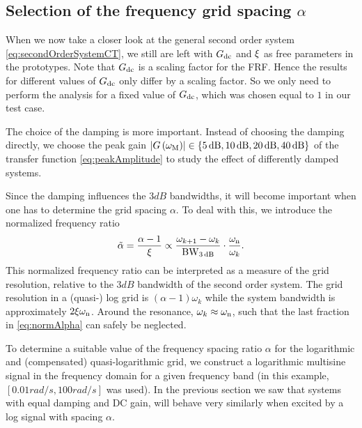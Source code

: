   \subsection{Selection of the frequency grid spacing $\alpha$}
  When we now take a closer look at the general second order system \eqref{eq:secondOrderSystemCT}, we still are left with $G_{\mathrm{dc}}$ and $\xi$ as free parameters in the prototypes.
  Note that $G_{\mathrm{dc}}$ is a scaling factor for the FRF.
  Hence the results for different values of $G_{\mathrm{dc}}$ only differ by a scaling factor.
  So we only need to perform the analysis for a fixed value of $G_{\mathrm{dc}}$, which was chosen equal to $1$ in our test case.

  The choice of the damping is more important.
  Instead of choosing the damping directly, we choose the peak gain $\left| G\left( \omega_{\mathrm{M}} \right) \right| \in \left\{5 \,\mathrm{dB}, 10 \,\mathrm{dB}, 20 \,\mathrm{dB}, 40 \,\mathrm{dB} \right\}$ of the transfer function \eqref{eq:peakAmplitude} to study the effect of differently damped systems.

  Since the damping influences the $3\unit{dB}$ bandwidths, it will become important when one has to determine the grid spacing $\alpha$.
  To deal with this, we introduce the normalized frequency ratio
  \begin{equation}
    \tilde{\alpha} = \frac{\alpha - 1}
                          {\xi}
                   \propto \frac{\omega_{k+1} - \omega_k}
                                {\mathrm{BW}_{3\,\mathrm{dB}}}
                           \cdot
                           \frac{\omega_{\mathrm{n}}}{\omega_k}
    \text{.}
    \label{eq:normAlpha} 
  \end{equation}
  This normalized frequency ratio can be interpreted as a measure of the grid resolution, relative to the $3\unit{dB}$ bandwidth of the second order system.
  The grid resolution in a (quasi-) log grid is $\left( \alpha - 1\right)\omega_k$ while the system bandwidth is approximately $2\xi\omega_{\mathrm{n}}$.
  Around the resonance, $\omega_k \approx \omega_{\mathrm{n}}$, such that the last fraction in \eqref{eq:normAlpha} can safely be neglected.
  
  To determine a suitable value of the frequency spacing ratio $\alpha$ for the logarithmic and (compensated) quasi-logarithmic grid, we construct a logarithmic multisine signal in the frequency domain for a given frequency band (in this example, $\left[ 0.01 \unit{rad/s}, 100 \unit{rad/s}\right]$ was used).
  In the previous section we saw that systems with equal damping and DC gain, will behave very similarly when excited by a log signal with spacing $\alpha$.

